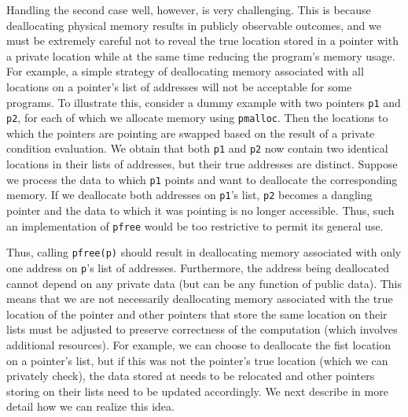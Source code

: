 \documentclass[11pt]{article}
\begin{document}
Handling the second case well, however, is very challenging. This is because
deallocating physical memory results in publicly observable outcomes, and
we must be extremely careful not to reveal the true location stored in a
pointer with a private location while at the same time reducing the
program's memory usage. For example, a simple strategy of deallocating
memory associated with all locations on a pointer's list of addresses will
not be acceptable for some programs. To illustrate this, consider a dummy
example with two pointers \texttt{p1} and \texttt{p2}, for each of which we
allocate memory using \texttt{pmalloc}. Then the locations to which the
pointers are pointing are swapped based on the result of a private condition
evaluation. We obtain that both \texttt{p1} and \texttt{p2} now contain two
identical locations in their lists of addresses, but their true addresses
are distinct. Suppose we process the data to which \texttt{p1} points and
want to deallocate the corresponding memory. If we deallocate both addresses
on \texttt{p1}'s list, \texttt{p2} becomes a dangling pointer and the data
to which it was pointing is no longer accessible. Thus, such an
implementation of \texttt{pfree} would be too restrictive to permit its
general use. 

Thus, calling \texttt{pfree(p)} should result in deallocating memory
associated with only one address on \texttt{p}'s list of addresses.
Furthermore, the address being deallocated cannot depend on any private data
(but can be any function of public data). This means that we are not
necessarily deallocating memory associated with the true location of the
pointer and other pointers that store the same location on their lists must
be adjusted to preserve correctness of the computation (which involves
additional resources). For example, we can choose to deallocate the fist
location  on a pointer's list, but if this was not the pointer's
true location (which we can privately check), the data stored at 
needs to be relocated and other pointers storing  on their lists
need to be updated accordingly. We next describe in more detail how we can
realize this idea.
\end{document}
